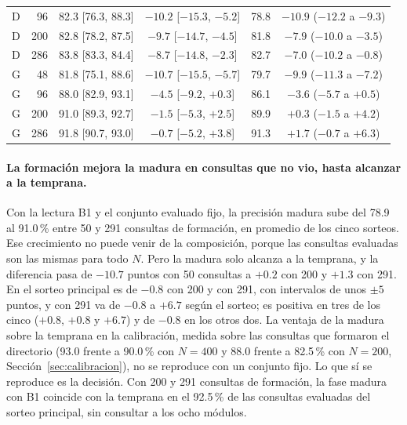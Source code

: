 \begin{table}[H]
\begin{tabular}{lrcccc}
        D  &  96 & 82.3 [76.3, 88.3] & $-10.2$ [$-15.3$, $-5.2$]  & 78.8 & $-10.9$ ($-12.2$ a $-9.3$) \\
        D  & 200 & 82.8 [78.2, 87.5] & $-9.7$ [$-14.7$, $-4.5$]   & 81.8 & $-7.9$ ($-10.0$ a $-3.5$) \\
        D  & 286 & 83.8 [83.3, 84.4] & $-8.7$ [$-14.8$, $-2.3$]   & 82.7 & $-7.0$ ($-10.2$ a $-0.8$) \\
        \midrule
        G  &  48 & 81.8 [75.1, 88.6] & $-10.7$ [$-15.5$, $-5.7$]  & 79.7 & $-9.9$ ($-11.3$ a $-7.2$) \\
        G  &  96 & 88.0 [82.9, 93.1] & $-4.5$ [$-9.2$, $+0.3$]    & 86.1 & $-3.6$ ($-5.7$ a $+0.5$) \\
        G  & 200 & 91.0 [89.3, 92.7] & $-1.5$ [$-5.3$, $+2.5$]    & 89.9 & $+0.3$ ($-1.5$ a $+4.2$) \\
        G  & 286 & 91.8 [90.7, 93.0] & $-0.7$ [$-5.2$, $+3.8$]    & 91.3 & $+1.7$ ($-0.7$ a $+6.3$) \\
        \bottomrule
    \end{tabular}
\end{table}

\paragraph{La formación mejora la madura en consultas que no vio, hasta alcanzar a la
temprana.}
Con la lectura B1 y el conjunto evaluado fijo, la precisión madura sube del 78.9 al
91.0\,\% entre 50 y 291 consultas de formación, en promedio de los cinco sorteos.
Ese crecimiento no puede venir de la composición, porque las consultas evaluadas son las
mismas para todo $N$.
Pero la madura solo alcanza a la temprana, y la diferencia pasa de $-10.7$ puntos con 50
consultas a $+0.2$ con 200 y $+1.3$ con 291.
En el sorteo principal es de $-0.8$ con 200 y con 291, con intervalos de unos $\pm 5$
puntos, y con 291 va de $-0.8$ a $+6.7$ según el sorteo; es positiva en tres de los
cinco ($+0.8$, $+0.8$ y $+6.7$) y de $-0.8$ en los otros dos.
La ventaja de la madura sobre la temprana en la calibración, medida sobre las consultas
que formaron el directorio (93.0 frente a 90.0\,\% con $N = 400$ y 88.0 frente a
82.5\,\% con $N = 200$, Sección~\ref{sec:calibracion}), no se reproduce con un conjunto
fijo.
Lo que sí se reproduce es la decisión.
Con 200 y 291 consultas de formación, la fase madura con B1 coincide con la temprana en
el 92.5\,\% de las consultas evaluadas del sorteo principal, sin consultar a los ocho
módulos.

